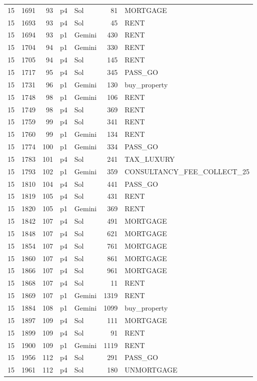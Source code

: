 \begin{longtable}{r r r l l r L{2.2in}}
15 & 1691 & 93 & p4 & Sol & 81 & MORTGAGE \\
15 & 1693 & 93 & p4 & Sol & 45 & RENT \\
15 & 1694 & 93 & p1 & Gemini & 430 & RENT \\
15 & 1704 & 94 & p1 & Gemini & 330 & RENT \\
15 & 1705 & 94 & p4 & Sol & 145 & RENT \\
15 & 1717 & 95 & p4 & Sol & 345 & PASS\_GO \\
15 & 1731 & 96 & p1 & Gemini & 130 & buy\_property \\
15 & 1748 & 98 & p1 & Gemini & 106 & RENT \\
15 & 1749 & 98 & p4 & Sol & 369 & RENT \\
15 & 1759 & 99 & p4 & Sol & 341 & RENT \\
15 & 1760 & 99 & p1 & Gemini & 134 & RENT \\
15 & 1774 & 100 & p1 & Gemini & 334 & PASS\_GO \\
15 & 1783 & 101 & p4 & Sol & 241 & TAX\_LUXURY \\
15 & 1793 & 102 & p1 & Gemini & 359 & CONSULTANCY\_FEE\_COLLECT\_25 \\
15 & 1810 & 104 & p4 & Sol & 441 & PASS\_GO \\
15 & 1819 & 105 & p4 & Sol & 431 & RENT \\
15 & 1820 & 105 & p1 & Gemini & 369 & RENT \\
15 & 1842 & 107 & p4 & Sol & 491 & MORTGAGE \\
15 & 1848 & 107 & p4 & Sol & 621 & MORTGAGE \\
15 & 1854 & 107 & p4 & Sol & 761 & MORTGAGE \\
15 & 1860 & 107 & p4 & Sol & 861 & MORTGAGE \\
15 & 1866 & 107 & p4 & Sol & 961 & MORTGAGE \\
15 & 1868 & 107 & p4 & Sol & 11 & RENT \\
15 & 1869 & 107 & p1 & Gemini & 1319 & RENT \\
15 & 1884 & 108 & p1 & Gemini & 1099 & buy\_property \\
15 & 1897 & 109 & p4 & Sol & 111 & MORTGAGE \\
15 & 1899 & 109 & p4 & Sol & 91 & RENT \\
15 & 1900 & 109 & p1 & Gemini & 1119 & RENT \\
15 & 1956 & 112 & p4 & Sol & 291 & PASS\_GO \\
15 & 1961 & 112 & p4 & Sol & 180 & UNMORTGAGE \\

\end{longtable}
